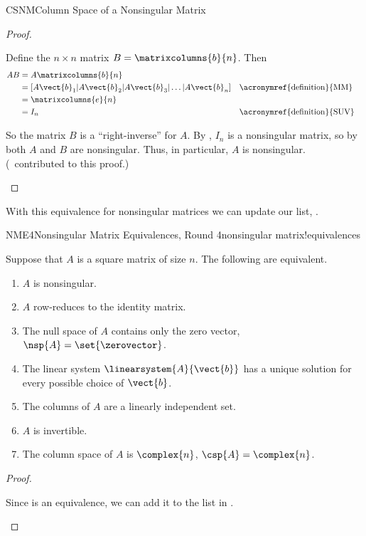 \begin{subsect}{CSNM}{Column Space of a Nonsingular Matrix}
\begin{proof}
%
\begin{para}Define the $n\times n$ matrix $B=\matrixcolumns{b}{n}$.  Then
%
\begin{align*}
AB
&=A\matrixcolumns{b}{n}\\
&=[A\vect{b}_1|A\vect{b}_2|A\vect{b}_3|\ldots|A\vect{b}_n]&&\text{\acronymref{definition}{MM}}\\
&=\matrixcolumns{e}{n}\\
&=I_n&&\text{\acronymref{definition}{SUV}}\\
\end{align*}\end{para}
%
\begin{para}So the matrix $B$ is a ``right-inverse'' for $A$.  By , $I_n$ is a nonsingular matrix, so by  both $A$ and $B$ are nonsingular.  Thus, in particular, $A$ is nonsingular.  (\travisosborne\ contributed to this proof.)\end{para}
%
\end{proof}
%
\begin{para}With this equivalence for nonsingular matrices we can update our list, .\end{para}
%
\begin{theorem}{NME4}{Nonsingular Matrix Equivalences, Round 4}{nonsingular matrix!equivalences}
\begin{para}Suppose that $A$ is a square matrix of size $n$.  The following are equivalent.
%
\begin{enumerate}
\item $A$ is nonsingular.
\item $A$ row-reduces to the identity matrix.
\item The null space of $A$ contains only the zero vector, $\nsp{A}=\set{\zerovector}$.
\item The linear system $\linearsystem{A}{\vect{b}}$ has a unique solution for every possible choice of $\vect{b}$.
\item The columns of $A$ are a linearly independent set.
\item $A$ is invertible.
\item The column space of $A$ is $\complex{n}$, $\csp{A}=\complex{n}$.
\end{enumerate}
\end{para}
\end{theorem}
%
\begin{proof}
\begin{para}Since  is an equivalence, we can add it to the list in .\end{para}
\end{proof}
%
%
\end{subsect}

